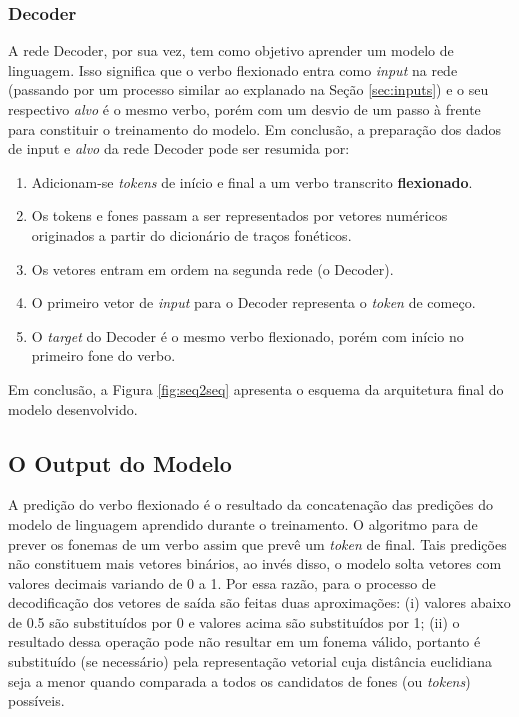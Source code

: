 \subsubsection{Decoder}

A rede Decoder, por sua vez, tem como objetivo aprender um modelo de linguagem. Isso significa que o verbo flexionado entra como \textit{input} na rede (passando por um processo similar ao explanado na Seção \ref{sec:inputs}) e o seu respectivo \textit{alvo} é o mesmo verbo, porém com um desvio de um passo à frente para constituir o treinamento do modelo. Em conclusão, a preparação dos dados de input e \textit{alvo} da rede Decoder pode ser resumida por:  

\begin{enumerate}
    \item Adicionam-se \textit{tokens} de início e final a um verbo transcrito \textbf{flexionado}.
    \item Os tokens e fones passam a ser representados por vetores numéricos originados a partir do dicionário de traços fonéticos.
    \item Os vetores entram em ordem na segunda rede (o Decoder).
    \item O primeiro vetor de \textit{input} para o Decoder representa o \textit{token} de começo.
    \item O \textit{target} do Decoder é o mesmo verbo flexionado, porém com início no primeiro fone do verbo.
\end{enumerate}

Em conclusão, a Figura \ref{fig:seq2seq} apresenta o esquema da arquitetura final do modelo desenvolvido. 



 \subsection{O Output do Modelo}

A predição do verbo flexionado é o resultado da concatenação das predições do modelo de linguagem aprendido durante o treinamento. O algoritmo para de prever os fonemas de um verbo assim que prevê um \textit{token} de final. Tais predições não constituem mais vetores binários, ao invés disso, o modelo solta vetores com valores decimais variando de 0 a 1. Por essa razão, para o processo de decodificação dos vetores de saída são feitas duas aproximações: (i) valores abaixo de 0.5 são substituídos por 0 e valores acima são substituídos por 1; (ii) o resultado dessa operação pode não resultar em um fonema válido, portanto é substituído (se necessário) pela representação vetorial cuja distância euclidiana seja a menor quando comparada a todos os candidatos de fones (ou \textit{tokens}) possíveis. 

